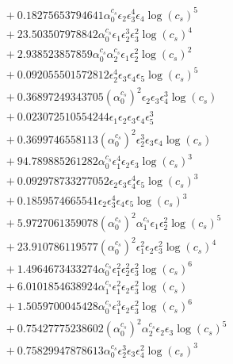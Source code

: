 \documentclass[10pt]{article}
\begin{document}
\begin{align*}
&{}  + 0.18275653794641 \alpha_{0}^{c_s} \epsilon_{2} \epsilon_{3}^{4} \epsilon_{4} \log{\left(c_{s} \right)}^{5} \\
&{}  + 23.503507978842 \alpha_{0}^{c_s} \epsilon_{1} \epsilon_{2}^{3} \epsilon_{3}^{2} \log{\left(c_{s} \right)}^{4} \\
&{}  + 2.938523857859 \alpha_{0}^{c_s} \alpha_{2}^{c_s} \epsilon_{1} \epsilon_{2}^{2} \log{\left(c_{s} \right)}^{2} \\
&{}  + 0.092055501572812 \epsilon_{2}^{4} \epsilon_{3} \epsilon_{4} \epsilon_{5} \log{\left(c_{s} \right)}^{5} \\
&{}  + 0.36897249343705 \left(\alpha_{0}^{c_s}\right)^{2} \epsilon_{2} \epsilon_{3} \epsilon_{4}^{3} \log{\left(c_{s} \right)} \\
&{}  + 0.023072510554244 \epsilon_{1} \epsilon_{2} \epsilon_{3} \epsilon_{4} \epsilon_{5}^{3} \\
&{}  + 0.3699746558113 \left(\alpha_{0}^{c_s}\right)^{2} \epsilon_{2}^{3} \epsilon_{3} \epsilon_{4} \log{\left(c_{s} \right)} \\
&{}  + 94.789885261282 \alpha_{0}^{c_s} \epsilon_{1}^{4} \epsilon_{2} \epsilon_{3} \log{\left(c_{s} \right)}^{3} \\
&{}  + 0.092978733277052 \epsilon_{2} \epsilon_{3} \epsilon_{4}^{4} \epsilon_{5} \log{\left(c_{s} \right)}^{3} \\
&{}  + 0.1859574665541 \epsilon_{2} \epsilon_{3}^{4} \epsilon_{4} \epsilon_{5} \log{\left(c_{s} \right)}^{3} \\
&{}  + 5.9727061359078 \left(\alpha_{0}^{c_s}\right)^{2} \alpha_{1}^{c_s} \epsilon_{1} \epsilon_{2}^{2} \log{\left(c_{s} \right)}^{5} \\
&{}  + 23.910786119577 \left(\alpha_{0}^{c_s}\right)^{2} \epsilon_{1}^{2} \epsilon_{2} \epsilon_{3}^{2} \log{\left(c_{s} \right)}^{4} \\
&{}  + 1.4964673433274 \alpha_{0}^{c_s} \epsilon_{1}^{2} \epsilon_{2}^{2} \epsilon_{3}^{2} \log{\left(c_{s} \right)}^{6} \\
&{}  + 6.0101854638924 \alpha_{1}^{c_s} \epsilon_{1}^{2} \epsilon_{2} \epsilon_{3}^{2} \log{\left(c_{s} \right)} \\
&{}  + 1.5059700045428 \alpha_{0}^{c_s} \epsilon_{1}^{3} \epsilon_{2} \epsilon_{3}^{2} \log{\left(c_{s} \right)}^{6} \\
&{}  + 0.75427775238602 \left(\alpha_{0}^{c_s}\right)^{2} \alpha_{2}^{c_s} \epsilon_{2} \epsilon_{3} \log{\left(c_{s} \right)}^{5} \\
&{}  + 0.75829947878613 \alpha_{0}^{c_s} \epsilon_{2}^{3} \epsilon_{3} \epsilon_{4}^{2} \log{\left(c_{s} \right)}^{3} \\

\end{align*}
\end{document}
